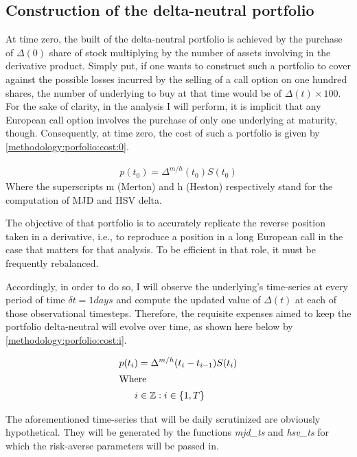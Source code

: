\documentclass[12pt]{report}
\begin{document}
\subsection{Construction of the delta-neutral portfolio}
\label{sec:methodology:construction}

At time zero, the built of the delta-neutral portfolio is achieved by the purchase of $\Delta(0)$ share of stock multiplying by the number of assets involving in the derivative product.
Simply put, if one wants to construct such a portfolio to cover against the possible losses incurred by the selling of a call option on one hundred shares, the number of underlying to buy at that time would be of $\Delta(t) \times 100$.
For the sake of clarity, in the analysis I will perform, it is implicit that any European call option involves the purchase of only one underlying at maturity, though.
Consequently, at time zero, the cost of such a portfolio is given by \cref{methodology:porfolio:cost:0}.

\begin{align}
p(t_0) = \Delta^{m/h}(t_0) S(t_0) \label{methodology:porfolio:cost:0}
\end{align}
Where the superscripts m (Merton) and h (Heston) respectively stand for the computation of MJD and HSV delta.

The objective of that portfolio is to accurately replicate the reverse position taken in a derivative, i.e., to reproduce a position in a long European call in the case that matters for that analysis.
To be efficient in that role, it must be frequently rebalanced.

Accordingly, in order to do so, I will observe the underlying's time-series at every period of time $\delta t = 1 days$ and compute the updated value of $\Delta(t)$  at each of those observational timesteps.
Therefore, the requisite expenses aimed to keep the portfolio delta-neutral will evolve over time, as shown here below by \cref{methodology:porfolio:cost:i}.

\begin{align}
p(t_i) & = \Delta^{m/h}(t_i - t_{i - 1}) S(t_i) \label{methodology:porfolio:cost:i} \\
\intertext{Where}
i &\in \mathbb{Z} : i \in \left \{1, T \right \} \notag
\end{align}

The aforementioned time-series that will be daily scrutinized are obviously hypothetical. They will be generated by the functions \textit{mjd\_ts} and \textit{hsv\_ts} for which the risk-averse parameters will be passed in.
\end{document}
